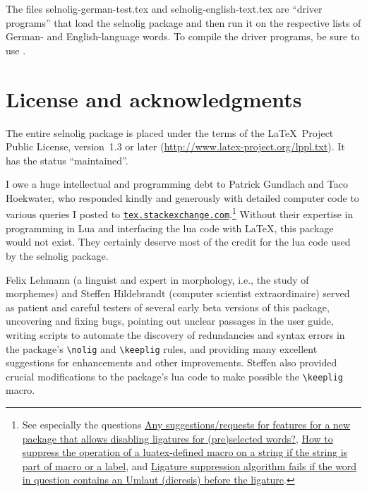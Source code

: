 \documentclass[11pt]{article}
\newcommand{\pkg}[1]{\textsf{#1}}
\newcommand{\cmmd}[1]{\texttt{\textbackslash #1}}
\begin{document}
The files \pkg{selnolig-german-test.tex} and \pkg{selnolig-english-text.tex} are \enquote{driver programs} that load the \pkg{selnolig} package and then run it on the respective lists of German- and English-language words. To compile the driver programs, be sure to use \LuaLaTeX.

\section{License and acknowledgments} \label{sec:thanks}

The entire \pkg{selnolig} package is placed under the terms of the \LaTeX\ Project Public License, version~1.3 or later (\url{http://www.latex-project.org/lppl.txt}).
It has the status \enquote{maintained}.

I owe a huge intellectual and programming debt to Patrick Gundlach and Taco Hoekwater, who responded kindly and generously with detailed computer code to various queries I posted to \href{http://tex.stackexchange.com}{\texttt{tex.stackexchange.com}}.\footnote{See especially the questions \href{http://tex.stackexchange.com/q/37443/5001}{Any suggestions/requests for features for a new package that allows disabling ligatures for (pre)selected words?}, \href{http://tex.stackexchange.com/q/48516/5001}{How to suppress the operation of a luatex-defined macro on a string if the string is part of macro or a label}, and \href{http://tex.stackexchange.com/q/63005/5001}{Ligature suppression algorithm fails if the word in question contains an Umlaut (dieresis) before the ligature}.} Without their expertise in programming in Lua and interfacing the lua code with \LaTeX, this package would not exist. They certainly deserve most of the credit for the lua code used by the \pkg{selnolig} package.

Felix Lehmann (a linguist and expert in morphology, i.e., the study of morphemes) and Steffen Hildebrandt (computer scientist extraordinaire) served as patient and careful testers of several early beta versions of this package, uncovering and fixing bugs, pointing out unclear passages in the user guide, writing scripts to automate the discovery of redundancies and syntax errors in the package's \cmmd{nolig} and \cmmd{keeplig} rules, and providing many excellent suggestions for enhancements and other improvements. Steffen also provided crucial modifications to the package's lua code to make possible the \cmmd{keeplig} macro.
\end{document}
